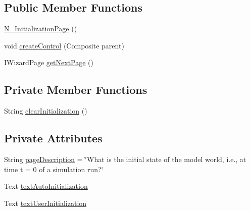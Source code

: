 \subsection*{Public Member Functions}
\begin{DoxyCompactItemize}
\item 
\hyperlink{classit_1_1isislab_1_1masonassisteddocumentation_1_1mason_1_1wizards_1_1_n___initialization_page_a8501f2dfd987e387639b3293521f7203}{N\-\_\-\-Initialization\-Page} ()
\item 
void \hyperlink{classit_1_1isislab_1_1masonassisteddocumentation_1_1mason_1_1wizards_1_1_n___initialization_page_a32fcf510e7df44b581f574bd7bbd8056}{create\-Control} (Composite parent)
\item 
I\-Wizard\-Page \hyperlink{classit_1_1isislab_1_1masonassisteddocumentation_1_1mason_1_1wizards_1_1_n___initialization_page_a7716b4e4ea3b81c9976aae1b7ae60547}{get\-Next\-Page} ()
\end{DoxyCompactItemize}
\subsection*{Private Member Functions}
\begin{DoxyCompactItemize}
\item 
String \hyperlink{classit_1_1isislab_1_1masonassisteddocumentation_1_1mason_1_1wizards_1_1_n___initialization_page_a843eb91d85d600eee9b5ebeab92f4e79}{clear\-Initialization} ()
\end{DoxyCompactItemize}
\subsection*{Private Attributes}
\begin{DoxyCompactItemize}
\item 
String \hyperlink{classit_1_1isislab_1_1masonassisteddocumentation_1_1mason_1_1wizards_1_1_n___initialization_page_a7835218cce26ad68f1fe35ef8aa1de4a}{page\-Description} = \char`\"{}What is the initial state of the model world, i.\-e., at time t = 0 of a simulation run?\char`\"{}
\item 
Text \hyperlink{classit_1_1isislab_1_1masonassisteddocumentation_1_1mason_1_1wizards_1_1_n___initialization_page_a4b4cb1f0586ca987cd4c55f3de016f27}{text\-Auto\-Initialization}
\item 
Text \hyperlink{classit_1_1isislab_1_1masonassisteddocumentation_1_1mason_1_1wizards_1_1_n___initialization_page_a801ef706c684a82e18b90c3bf95d84f7}{text\-User\-Initialization}
\end{DoxyCompactItemize}


